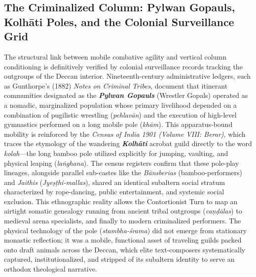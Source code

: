 \documentclass[11pt,letterpaper]{article}
\begin{document}
\subsection{The Criminalized Column: Pylwan Gopauls, Kolhāti Poles, and the Colonial Surveillance Grid}
The structural link between mobile combative agility and vertical column conditioning is definitively verified by colonial surveillance records tracking the outgroups of the Deccan interior. Nineteenth-century administrative ledgers, such as Gunthorpe’s (1882) \textit{Notes on Criminal Tribes}, document that itinerant communities designated as the \textbf{\textit{Pylwan Gopauls}} (Wrestler Gopals) operated as a nomadic, marginalized population whose primary livelihood depended on a combination of pugilistic wrestling (\textit{pehlavān}) and the execution of high-level gymnastics performed on a long mobile pole (\textit{khām}). This apparatus-bound mobility is reinforced by the \textit{Census of India 1901 (Volume VIII: Berar)}, which traces the etymology of the wandering \textbf{\textit{Kolhāti}} acrobat guild directly to the word \textit{kolah}---the long bamboo pole utilized explicitly for jumping, vaulting, and physical leaping (\textit{laṅghana}). The census registers confirm that these pole-play lineages, alongside parallel sub-castes like the \textit{Bānsberias} (bamboo-performers) and \textit{Jaithis} (\textit{Jyeṣṭhi-mallas}), shared an identical subaltern social stratum characterized by rope-dancing, public entertainment, and systemic social exclusion. This ethnographic reality allows the Contortionist Turn to map an airtight somatic genealogy running from ancient tribal outgroups (\textit{caṇḍālas}) to medieval arena specialists, and finally to modern criminalized performers. The physical technology of the pole (\textit{stambha-śrama}) did not emerge from stationary monastic reflection; it was a mobile, functional asset of traveling guilds packed onto draft animals across the Deccan, which elite text-composers systematically captured, institutionalized, and stripped of its subaltern identity to serve an orthodox theological narrative.
\end{document}
